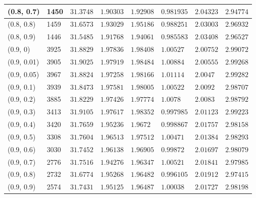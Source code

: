 \begin{center}
{\begin{longtable}{| l | p{} |  p{} | p{} | p{} | p{} | p{} | p{} |}
 (0.8, 0.7) & 1450  & $31.3748$ & $1.90303$ & $1.92908$ & $0.981935$ & $2.04323$ & $2.94774$ \\ \hline
 (0.8, 0.8) & 1459  & $31.6573$ & $1.93029$ & $1.95186$ & $0.988251$ & $2.03003$ & $2.96932$ \\ \hline
 (0.8, 0.9) & 1446  & $31.5485$ & $1.91768$ & $1.94061$ & $0.985583$ & $2.03408$ & $2.96527$ \\ \hline
 (0.9, 0) & 3925  & $31.8829$ & $1.97836$ & $1.98408$ & $1.00527$ & $2.00752$ & $2.99072$ \\ \hline
 (0.9, 0.01) & 3905  & $31.9025$ & $1.97919$ & $1.98484$ & $1.00884$ & $2.00555$ & $2.99268$ \\ \hline
 (0.9, 0.05) & 3967  & $31.8824$ & $1.97258$ & $1.98166$ & $1.01114$ & $2.0047$ & $2.99282$ \\ \hline
 (0.9, 0.1) & 3939  & $31.8473$ & $1.97581$ & $1.98005$ & $1.00522$ & $2.0092$ & $2.98707$ \\ \hline
 (0.9, 0.2) & 3885  & $31.8229$ & $1.97426$ & $1.97774$ & $1.0078$ & $2.0083$ & $2.98792$ \\ \hline
 (0.9, 0.3) & 3413  & $31.9105$ & $1.97617$ & $1.98352$ & $0.997985$ & $2.01123$ & $2.99223$ \\ \hline
 (0.9, 0.4) & 3420  & $31.7659$ & $1.95236$ & $1.9672$ & $0.998867$ & $2.01757$ & $2.98158$ \\ \hline
 (0.9, 0.5) & 3308  & $31.7604$ & $1.96513$ & $1.97512$ & $1.00471$ & $2.01384$ & $2.98293$ \\ \hline
 (0.9, 0.6) & 3030  & $31.7452$ & $1.96138$ & $1.96905$ & $0.99872$ & $2.01697$ & $2.98079$ \\ \hline
 (0.9, 0.7) & 2776  & $31.7516$ & $1.94276$ & $1.96347$ & $1.00521$ & $2.01841$ & $2.97985$ \\ \hline
 (0.9, 0.8) & 2732  & $31.6774$ & $1.95268$ & $1.96482$ & $0.996105$ & $2.01912$ & $2.97415$ \\ \hline
 (0.9, 0.9) & 2574  & $31.7431$ & $1.95125$ & $1.96487$ & $1.00038$ & $2.01727$ & $2.98198$ \\ \hline
\end{longtable}

}
\end{center}
